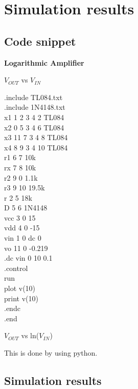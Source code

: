 \documentclass[12pt]{article}
\begin{document}
\section{Simulation results}%
\subsection{Code snippet}

\begin{center}
\textbf{Logarithmic Amplifier}
\end{center}
\begin{center}
$V_{OUT}$ vs $V_{IN}$
\end{center}
.include TL084.txt\\
.include 1N4148.txt\\
x1 1 2 3 4 2 TL084\\
x2 0 5 3 4 6 TL084\\
x3 11 7 3 4 8 TL084\\
x4 8 9 3 4 10 TL084\\
r1 6 7 10k\\
rx 7 8 10k\\
r2 9 0 1.1k\\
r3 9 10 19.5k\\
r 2 5 18k\\
D 5 6 1N4148\\
vcc 3 0 15\\
vdd 4 0 -15\\
vin 1 0 dc 0 \\
vo 11 0 -0.219\\
.dc vin 0 10 0.1\\
.control\\
run\\
plot v(10)\\
print v(10)\\
.endc\\
.end\\

\begin{center}
$V_{OUT}$ vs ln($V_{IN}$)
\end{center}
This is done by using python.


\subsection{Simulation results}
\end{document}
